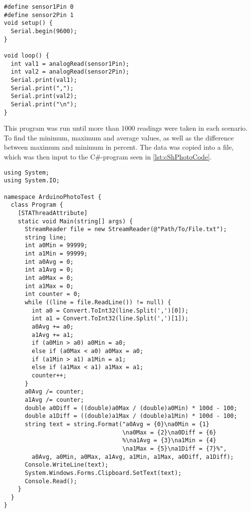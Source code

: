 \lstset{language=C}
\begin{lstlisting}[label = lst:arduinoPhotoCode, caption = Arduino program for photoresistor tests]
#define sensor1Pin 0
#define sensor2Pin 1
void setup() {
  Serial.begin(9600);
}

void loop() {
  int val1 = analogRead(sensor1Pin);
  int val2 = analogRead(sensor2Pin);
  Serial.print(val1);
  Serial.print(",");
  Serial.print(val2);
  Serial.print("\n");
}
\end{lstlisting}

This program was run until more than 1000 readings were taken in each scenario.
To find the minimum, maximum and average values, as well as the difference between maximum and minimum in percent. The data was copied into a file, which was then input to the C\#-program seen in \cref{lst:cShPhotoCode}.

\lstset{language=[Sharp]C}
\begin{lstlisting}[label = lst:cShPhotoCode, caption = C\# data processing code]
using System;
using System.IO;

namespace ArduinoPhotoTest {
  class Program {
    [STAThreadAttribute]
    static void Main(string[] args) {
      StreamReader file = new StreamReader(@"Path/To/File.txt");
      string line;
      int a0Min = 99999;
      int a1Min = 99999;
      int a0Avg = 0;
      int a1Avg = 0;
      int a0Max = 0;
      int a1Max = 0;
      int counter = 0;
      while ((line = file.ReadLine()) != null) {
        int a0 = Convert.ToInt32(line.Split(',')[0]);
        int a1 = Convert.ToInt32(line.Split(',')[1]);
        a0Avg += a0;
        a1Avg += a1;
        if (a0Min > a0) a0Min = a0;
        else if (a0Max < a0) a0Max = a0;
        if (a1Min > a1) a1Min = a1;
        else if (a1Max < a1) a1Max = a1;
        counter++;
      }
      a0Avg /= counter;
      a1Avg /= counter;
      double a0Diff = ((double)a0Max / (double)a0Min) * 100d - 100;
      double a1Diff = ((double)a1Max / (double)a1Min) * 100d - 100;
      string text = string.Format("a0Avg = {0}\na0Min = {1}
                                  \na0Max = {2}\na0Diff = {6}
                                  %\na1Avg = {3}\na1Min = {4}
                                  \na1Max = {5}\na1Diff = {7}%",
        a0Avg, a0Min, a0Max, a1Avg, a1Min, a1Max, a0Diff, a1Diff);
      Console.WriteLine(text);
      System.Windows.Forms.Clipboard.SetText(text);
      Console.Read();
    }
  }
}
\end{lstlisting}
